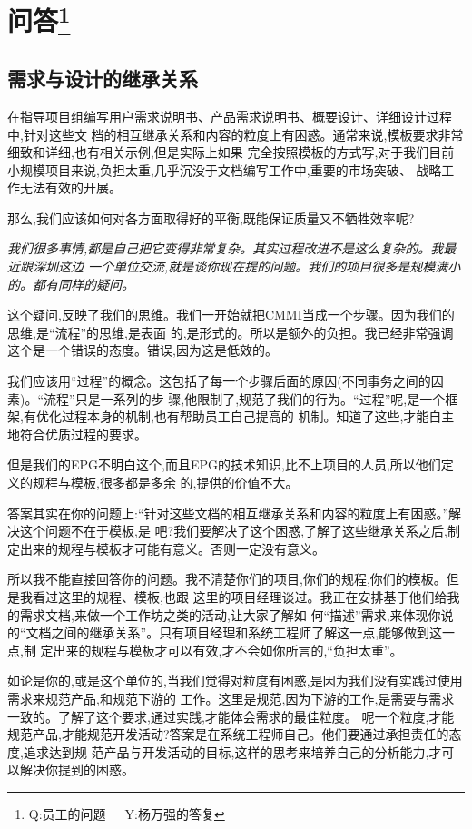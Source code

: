 \documentclass[11pt]{article}
\begin{document}
\pagebreak
\setcounter{page}{1}
\pagestyle{fancy}
\section{问答\footnote{\textsf{Q:员工的问题~~~Y:杨万强的答复}}}
\subsection{需求与设计的继承关系}\label{link1}

\qlogo \rmfamily 在指导项目组编写用户需求说明书、产品需求说明书、概要设计、详细设计过程中,针对这些文
档的相互继承关系和内容的粒度上有困惑。通常来说,模板要求非常细致和详细,也有相关示例,但是实际上如果
完全按照模板的方式写,对于我们目前小规模项目来说,负担太重,几乎沉没于文档编写工作中,重要的市场突破、
战略工作无法有效的开展。

那么,我们应该如何对各方面取得好的平衡,既能保证质量又不牺牲效率呢?


\ylogo \itshape 我们很多事情,都是自己把它变得非常复杂。其实过程改进不是这么复杂的。我最近跟深圳这边
一个单位交流,就是谈你现在提的问题。我们的项目很多是规模满小的。都有同样的疑问。

这个疑问,反映了我们的思维。我们一开始就把CMMI当成一个步骤。因为我们的思维,是``流程''的思维,是表面
的,是形式的。所以是额外的负担。我已经非常强调这个是一个错误的态度。错误,因为这是低效的。

我们应该用``过程''的概念。这包括了每一个步骤后面的原因(不同事务之间的因素)。``流程''只是一系列的步
骤,他限制了,规范了我们的行为。``过程''呢,是一个框架,有优化过程本身的机制,也有帮助员工自己提高的
机制。知道了这些,才能自主地符合优质过程的要求。

但是我们的EPG不明白这个,而且EPG的技术知识,比不上项目的人员,所以他们定义的规程与模板,很多都是多余
的,提供的价值不大。

答案其实在你的问题上:``针对这些文档的相互继承关系和内容的粒度上有困惑。''解决这个问题不在于模板,是
吧?我们要解决了这个困惑,了解了这些继承关系之后,制定出来的规程与模板才可能有意义。否则一定没有意义。

所以我不能直接回答你的问题。我不清楚你们的项目,你们的规程,你们的模板。但是我看过这里的规程、模板,也跟
这里的项目经理谈过。我正在安排基于他们给我的需求文档,来做一个工作坊之类的活动,让大家了解如
何``描述''需求,来体现你说的``文档之间的继承关系''。只有项目经理和系统工程师了解这一点,能够做到这一点,制
定出来的规程与模板才可以有效,才不会如你所言的,``负担太重''。

如论是你的,或是这个单位的,当我们觉得对粒度有困惑,是因为我们没有实践过使用需求来规范产品,和规范下游的
工作。这里是规范,因为下游的工作,是需要与需求一致的。了解了这个要求,通过实践,才能体会需求的最佳粒度。
呢一个粒度,才能规范产品,才能规范开发活动?答案是在系统工程师自己。他们要通过承担责任的态度,追求达到规
范产品与开发活动的目标,这样的思考来培养自己的分析能力,才可以解决你提到的困惑。
\end{document}
